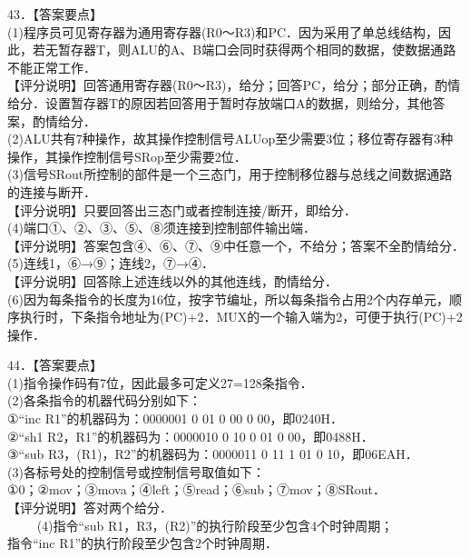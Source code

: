 43．【答案要点】\\
(1)程序员可见寄存器为通用寄存器(R0～R3)和PC．因为采用了单总线结构，因此，若无暂存器T，则ALU的A、B端口会同时获得两个相同的数据，使数据通路不能正常工作．\\
【评分说明】回答通用寄存器(R0～R3)，给分；回答PC，给分；部分正确，酌情给分．设置暂存器T的原因若回答用于暂时存放端口A的数据，则给分，其他答案，酌情给分．\\
(2)ALU共有7种操作，故其操作控制信号ALUop至少需要3位；移位寄存器有3种操作，其操作控制信号SRop至少需要2位．\\
(3)信号SRout所控制的部件是一个三态门，用于控制移位器与总线之间数据通路的连接与断开．\\
【评分说明】只要回答出三态门或者控制连接/断开，即给分．\\(4)端口①、②、③、⑤、⑧须连接到控制部件输出端．\\
【评分说明】答案包含④、⑥、⑦、⑨中任意一个，不给分；答案不全酌情给分．\\
(5)连线1，⑥→⑨；连线2，⑦→④．\\
【评分说明】回答除上述连线以外的其他连线，酌情给分．\\
(6)因为每条指令的长度为16位，按字节编址，所以每条指令占用2个内存单元，顺序执行时，下条指令地址为(PC)+2．MUX的一个输入端为2，可便于执行(PC)+2操作．

44．【答案要点】\\
(1)指令操作码有7位，因此最多可定义27=128条指令．\\
(2)各条指令的机器代码分别如下：\\
①“inc R1”的机器码为：0000001 0 01 0 00 0 00，即0240H．\\
②“sh1 R2，R1”的机器码为：0000010 0 10 0 01 0 00，即0488H．\\
③“sub R3，(R1)，R2”的机器码为：0000011 0 11 1 01 0 10，即06EAH．\\
(3)各标号处的控制信号或控制信号取值如下：\\
①0；②mov；③mova；④left；⑤read；⑥sub；⑦mov；⑧SRout．\\
【评分说明】答对两个给分．\\
$\qquad$ (4)指令“sub R1，R3，(R2)”的执行阶段至少包含4个时钟周期；\\
指令“inc R1”的执行阶段至少包含2个时钟周期．

